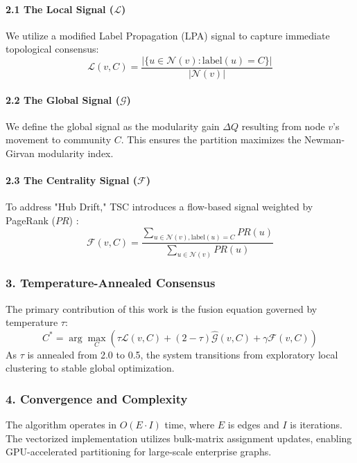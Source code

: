 \paragraph{2.1 The Local Signal ($\mathcal{L}$)}
We utilize a modified Label Propagation (LPA) \cite{raghavan2007lpa} signal to capture immediate topological consensus:
\begin{equation}
\mathcal{L}(v, C) = \frac{|\{u \in \mathcal{N}(v) : \text{label}(u) = C\}|}{|\mathcal{N}(v)|}
\end{equation}

\paragraph{2.2 The Global Signal ($\mathcal{G}$)}
We define the global signal as the modularity gain $\Delta Q$ resulting from node $v$'s movement to community $C$. This ensures the partition maximizes the Newman-Girvan modularity index.

\paragraph{2.3 The Centrality Signal ($\mathcal{F}$)}
To address "Hub Drift," TSC introduces a flow-based signal weighted by PageRank ($PR$) \cite{page1999pagerank}:
\begin{equation}
\mathcal{F}(v, C) = \frac{\sum_{u \in \mathcal{N}(v), \text{label}(u)=C} PR(u)}{\sum_{u \in \mathcal{N}(v)} PR(u)}
\end{equation}

\subsubsection{3. Temperature-Annealed Consensus}
The primary contr\-ibution of this work is the fusion equation governed by temperature $\tau$:
\begin{equation}
C^* = \arg\max_{C} ( \tau \mathcal{L}(v, C) + (2 - \tau) \widehat{\mathcal{G}}(v, C) + \gamma \mathcal{F}(v, C) )
\end{equation}
As $\tau$ is annealed from 2.0 to 0.5, the system transitions from exploratory local clustering to stable global optim\-ization.

\subsubsection{4. Convergence and Complexity}
The algorithm operates in $O(E \cdot I)$ time, where $E$ is edges and $I$ is iterations. The vectorized imple\-mentation utilizes bulk-matrix assignment updates, enabling GPU-accelerated parti\-tioning for large-scale enterprise graphs.

